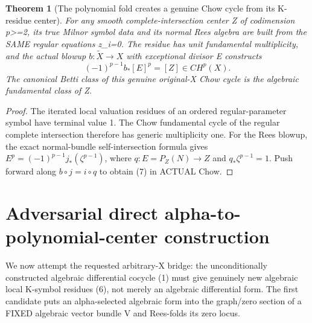 \documentclass[11pt]{article}
\newtheorem{theorem}{Theorem}[section]
\begin{document}
\begin{theorem}[The polynomial fold creates a genuine Chow cycle from its K-residue center]
For any smooth complete-intersection center
Z of codimension p>=2, its true Milnor
symbol data and its normal Rees algebra
are built from the SAME regular equations
z_i=0. The residue has unit fundamental
multiplicity, and the actual blowup
$b:\widetilde X\to X$ with exceptional
divisor E constructs
\[
 \boxed{(-1)^{p-1}b_*[E]^p=[Z]
                             \in CH^p(X).}       \tag{7}
\]
The canonical Betti class of this genuine
original-X Chow cycle is the algebraic
fundamental class of Z.
\end{theorem}
\begin{proof}
The iterated local valuation residues of
an ordered regular-parameter symbol have
terminal value 1. The Chow fundamental
cycle of the regular complete intersection
therefore has generic multiplicity one.
For the Rees blowup, the exact normal-bundle
self-intersection formula gives
$E^p=(-1)^{p-1}j_*(\zeta^{p-1})$,
where $q:E=P_Z(N)\to Z$ and
$q_*\zeta^{p-1}=1$.
Push forward along $b\circ j=i\circ q$
to obtain (7) in ACTUAL Chow.
\end{proof}

\section{Adversarial direct alpha-to-polynomial-center construction}
We now attempt the requested arbitrary-X bridge:
the unconditionally constructed
algebraic differential cocycle (1)
must give genuinely new algebraic
local K-symbol residues (6), not merely
an algebraic differential form.
The first candidate puts an alpha-selected
algebraic form into the graph/zero section
of a FIXED algebraic vector bundle V
and Rees-folds its zero locus.
\end{document}
